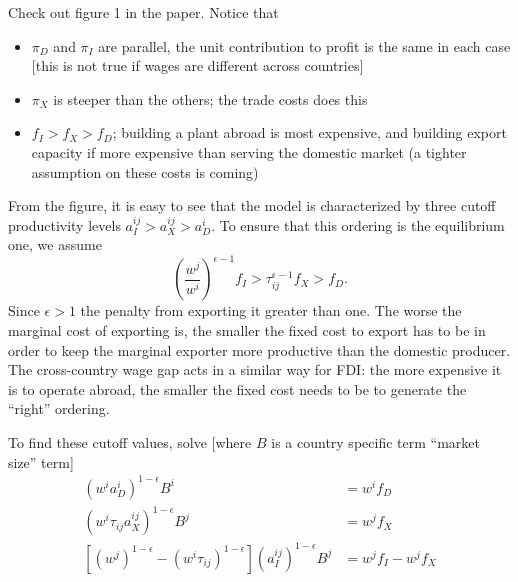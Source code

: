\documentclass[11pt, pdftex]{article}
\begin{document}
Check out figure 1 in the paper. Notice that
\begin{itemize}
\item $\pi_D$ and $\pi_I$ are parallel, the unit contribution to profit is the same in each case [this is not true if wages are different across countries]
\item $\pi_X$ is steeper than the others; the trade costs does this
\item $f_I > f_X > f_D$; building a plant abroad is most expensive, and building export capacity if more expensive than serving the domestic market (a tighter assumption on these costs is coming)
\end{itemize}
From the figure, it is easy to see that the model is characterized by three cutoff productivity levels $a_I^{ij}>a_X^{ij}>a_D^i$. To ensure that this ordering is the equilibrium one, we assume
\begin{equation}
    \left(\frac{w^j}{w^i}\right)^{\epsilon-1}f_I>\tau_{ij}^{\epsilon-1}f_X>f_D.
\end{equation}
Since $\epsilon>1$ the penalty from exporting it greater than one. The worse the marginal cost of exporting is, the smaller the fixed cost to export has to be in order to keep the marginal exporter more productive than the domestic producer. The cross-country wage gap acts in a similar way for FDI: the more expensive it is to operate abroad, the smaller the fixed cost needs to be to generate the ``right'' ordering.


To find these cutoff values, solve [where $B$ is a country specific term ``market size'' term]
\begin{align}
  \left(w^ia^i_D\right)^{1-\epsilon}B^i&=w^if_D \label{eq:cutD}\\
  \left(w^i\tau_{ij}a^{ij}_X\right)^{1-\epsilon}B^j&=w^jf_X \label{eq:cutX}\\
  [(w^j)^{1-\epsilon}-(w^i\tau_{ij})^{1-\epsilon}]\left(a^{ij}_I\right)^{1-\epsilon}B^j&=w^jf_I-w^jf_X \label{eq:cutF}
\end{align}
\end{document}
